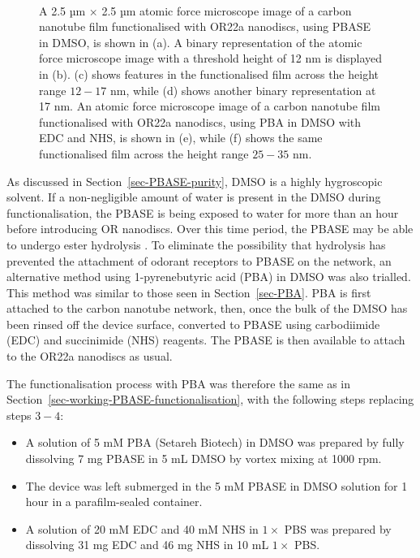 \documentclass[
  a4paper,
]{scrbook}
\begin{document}
\begin{figure}
\begin{minipage}[t]{0.01\linewidth}
{\centering 

~

}

\end{minipage}%

\caption[A 2.5 µm \(\times\) 2.5 µm atomic force microscope image of a
carbon nanotube film functionalised with OR22a nanodiscs using PBASE in
DMSO, with masking and binary representations used to indicate substrate
and nanodisc heights.]{\label{fig-DMSO-AFM-comparison}A 2.5 µm
\(\times\) 2.5 µm atomic force microscope image of a carbon nanotube
film functionalised with OR22a nanodiscs, using PBASE in DMSO, is shown
in (a). A binary representation of the atomic force microscope image
with a threshold height of 12 nm is displayed in (b). (c) shows features
in the functionalised film across the height range \(12-17\) nm, while
(d) shows another binary representation at 17 nm. An atomic force
microscope image of a carbon nanotube film functionalised with OR22a
nanodiscs, using PBA in DMSO with EDC and NHS, is shown in (e), while
(f) shows the same functionalised film across the height range \(25-35\)
nm.}

\end{figure}

As discussed in Section~\ref{sec-PBASE-purity}, DMSO is a highly
hygroscopic solvent. If a non-negligible amount of water is present in
the DMSO during functionalisation, the PBASE is being exposed to water
for more than an hour before introducing OR nanodiscs. Over this time
period, the PBASE may be able to undergo ester hydrolysis
\autocite{Hermanson2013-3}. To eliminate the possibility that hydrolysis
has prevented the attachment of odorant receptors to PBASE on the
network, an alternative method using 1-pyrenebutyric acid (PBA) in DMSO
was also trialled. This method was similar to those seen in
Section~\ref{sec-PBA}. PBA is first attached to the carbon nanotube
network, then, once the bulk of the DMSO has been rinsed off the device
surface, converted to PBASE using carbodiimide (EDC) and succinimide
(NHS) reagents. The PBASE is then available to attach to the OR22a
nanodiscs as usual.

The functionalisation process with PBA was therefore the same as in
Section~\ref{sec-working-PBASE-functionalisation}, with the following
steps replacing steps \(3-4\):

\begin{itemize}
\item
  A solution of 5 mM PBA (Setareh Biotech) in DMSO was prepared by fully
  dissolving 7 mg PBASE in 5 mL DMSO by vortex mixing at 1000 rpm.
\item
  The device was left submerged in the 5 mM PBASE in DMSO solution for 1
  hour in a parafilm-sealed container.
\item
  A solution of 20 mM EDC and 40 mM NHS in \(1 \times\) PBS was prepared
  by dissolving 31 mg EDC and 46 mg NHS in 10 mL \(1 \times\) PBS.
\end{itemize}
\end{document}
